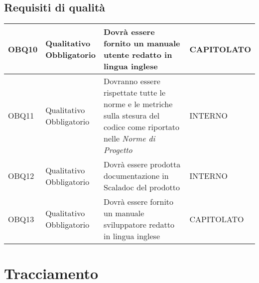 \documentclass{scalatekids-article}
\begin{document}
\subsection{Requisiti di qualità}
\begin{longtable}[H]{|l|p{2cm}|p{6cm}|p{4cm}|}
  \hline
  OBQ10 & \multiLineCell{Qualitativo\\Obbligatorio} & Dovrà essere fornito un manuale utente redatto in lingua inglese & \multiLineCell{CAPITOLATO\\}\\
  \hline
  OBQ11 & \multiLineCell{Qualitativo\\Obbligatorio} & Dovranno essere rispettate tutte le norme e le metriche sulla stesura del codice come riportato nelle \textit{Norme di Progetto} & \multiLineCell{INTERNO\\}\\
  \hline
  OBQ12 & \multiLineCell{Qualitativo\\Obbligatorio} & Dovrà essere prodotta documentazione in Scaladoc del prodotto & \multiLineCell{INTERNO\\}\\
  \hline
  OBQ13 & \multiLineCell{Qualitativo\\Obbligatorio} & Dovrà essere fornito un manuale sviluppatore redatto in lingua inglese & \multiLineCell{CAPITOLATO\\}\\
  \hline
\end{longtable}
\newpage

\section{Tracciamento}
\end{document}

